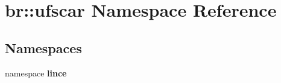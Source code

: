 \section{br::ufscar Namespace Reference}
\label{namespacebr_1_1ufscar}


\subsection*{Namespaces}
\begin{CompactItemize}
\item 
namespace {\bf lince}
\end{CompactItemize}
